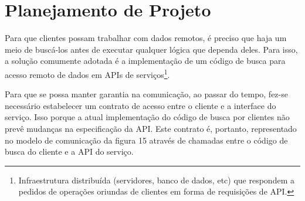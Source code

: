 \section{Planejamento de Projeto}

Para que clientes possam trabalhar com dados remotos, é preciso que haja um meio de buscá-los antes de executar qualquer lógica que dependa deles. Para isso, a solução comumente adotada é a implementação de um código de busca para acesso remoto de dados em APIs de serviços\footnote{
  Infraestrutura distribuída (servidores, banco de dados, etc) que respondem a pedidos de operações oriundas de clientes em forma de requisições de API.
}.

Para que se possa manter garantia na comunicação, ao passar do tempo, fez-se necessário estabelecer um contrato de acesso entre o cliente e a interface do serviço. Isso porque a atual implementação do código de busca por clientes não prevê mudanças na especificação da API. Este contrato é, portanto, representado no modelo de comunicação da figura 15 através de chamadas entre o código de busca do cliente e a API do serviço.

